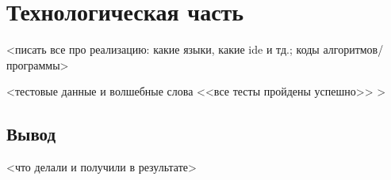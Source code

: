 \chapter{Технологическая часть}

<писать все про реализацию: какие языки, какие ide и тд.; коды алгоритмов/программы>

<тестовые данные и волшебные слова <<все тесты пройдены успешно>> >

\section*{Вывод}

<что делали и получили в результате>

\clearpage
